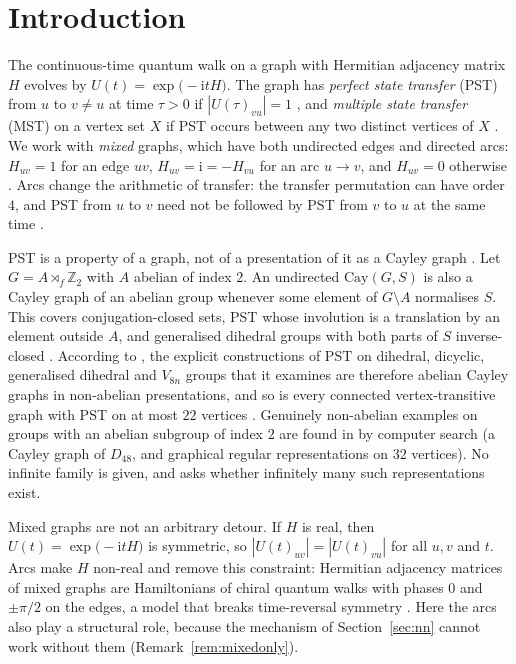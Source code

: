 \documentclass[preprint,11pt]{elsarticle}
\theoremstyle{definition}
\theoremstyle{remark}
\newcommand{\Z}{\mathbb Z}
\newcommand{\ii}{\mathrm i}
\begin{document}
\section{Introduction}

The continuous-time quantum walk on a graph with Hermitian adjacency matrix $H$ evolves by $U(t)=\exp\bigl(-\ii tH\bigr)$. The graph has \emph{perfect state transfer} (PST) from $u$ to $v\ne u$ at time $\tau>0$ if $|U(\tau)_{vu}|=1$ \cite{Bose,Christandl}, and \emph{multiple state transfer} (MST) on a vertex set $X$ if PST occurs between any two distinct vertices of $X$ \cite{GodsilLato,SongLin}. We work with \emph{mixed} graphs, which have both undirected edges and directed arcs: $H_{uv}=1$ for an edge $uv$, $H_{uv}=\ii=-H_{vu}$ for an arc $u\to v$, and $H_{uv}=0$ otherwise \cite{Liu,Guo}. Arcs change the arithmetic of transfer: the transfer permutation can have order $4$, and PST from $u$ to $v$ need not be followed by PST from $v$ to $u$ at the same time \cite{SongLinEJC}.

PST is a property of a graph, not of a presentation of it as a Cayley graph \cite{AG}. Let $G=A\rtimes_f\Z_2$ with $A$ abelian of index $2$. An undirected $\mathrm{Cay}(G,S)$ is also a Cayley graph of an abelian group whenever some element of $G\setminus A$ normalises $S$. This covers conjugation-closed sets, PST whose involution is a translation by an element outside $A$, and generalised dihedral groups with both parts of $S$ inverse-closed \cite{AG,MS}. According to \cite{AG}, the explicit constructions of PST on dihedral, dicyclic, generalised dihedral and $V_{8n}$ groups that it examines are therefore abelian Cayley graphs in non-abelian presentations, and so is every connected vertex-transitive graph with PST on at most $22$ vertices \cite[Section~6]{AG}. Genuinely non-abelian examples on groups with an abelian subgroup of index $2$ are found in \cite{AG} by computer search (a Cayley graph of $D_{48}$, and graphical regular representations on $32$ vertices). No infinite family is given, and \cite[Problem~8.2]{AG} asks whether infinitely many such representations exist.

Mixed graphs are not an arbitrary detour. If $H$ is real, then $U(t)=\exp\bigl(-\ii tH\bigr)$ is symmetric, so $|U(t)_{uv}|=|U(t)_{vu}|$ for all $u,v$ and $t$. Arcs make $H$ non-real and remove this constraint: Hermitian adjacency matrices of mixed graphs are Hamiltonians of chiral quantum walks with phases $0$ and $\pm\pi/2$ on the edges, a model that breaks time-reversal symmetry \cite{Lu,Acuaviva}. Here the arcs also play a structural role, because the mechanism of Section~\ref{sec:nn} cannot work without them (Remark~\ref{rem:mixedonly}).
\end{document}
